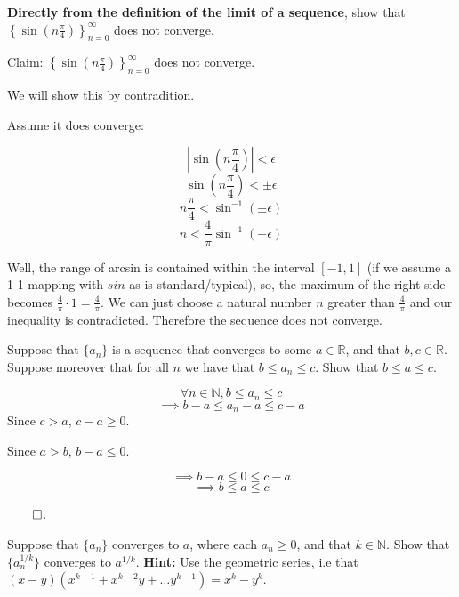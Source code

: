\documentclass[answers]{exam}
\theoremstyle{remark}
\theoremstyle{definition}
\newcommand{\NN}{\mathbb{N}}
\newcommand{\RR}{\mathbb{R}}
\begin{document}
\begin{questions}
\question \textbf{Directly from the definition of the limit of a sequence}, show that $\left\lbrace \sin \left(n \frac{\pi}{4} \right) \right\rbrace_{n=0}^{\infty}$ does not converge.

\begin{solution}

Claim: $\left\lbrace \sin \left(n \frac{\pi}{4} \right) \right\rbrace_{n=0}^{\infty}$ does not converge.


We will show this by contradition.

Assume it does converge:

\[\left|\sin \left(n \frac{\pi}{4} \right) \right| < \epsilon\]
\[\sin \left(n \frac{\pi}{4} \right) < \pm \epsilon\]
\[n \frac{\pi}{4}< \sin^{-1} \left(\pm \epsilon\right)\]
\[n < \frac{4}{\pi} \sin^{-1} \left(\pm \epsilon\right)\]

Well, the range of arcsin is contained within the interval $[-1, 1]$
(if we assume a 1-1 mapping with $sin$ as is standard/typical),
so, the maximum of the right side becomes $\frac{4}{\pi} \cdot 1 = \frac{4}{\pi}$.
We can just choose a natural number $n$ greater than $\frac{4}{\pi}$ and our
inequality is contradicted. Therefore the sequence does not converge.



 \end{solution}





\question Suppose that $\{a_n\}$ is a sequence that converges to some $a \in \RR$, and that $b,c \in \RR$. Suppose moreover that for all $n$ we have that $b \le a_n \le c$. Show that $b \le a \le c$. 
\begin{solution}

\[\forall n \in \NN, b \le a_n \le c\]
\[\implies b-a \leq a_n - a \leq c-a\]
Since $c > a$, $c-a \geq 0$.

Since $a > b$,  $b - a \leq 0$.

\[\implies b-a \leq 0 \leq c-a\]
\[\implies b \leq a \leq c\]

$\qed$.



\end{solution}

\question Suppose that $\{a_n\}$ converges to $a$, where each $a_n \ge 0$, and that $k \in \NN$. Show that $\{a_n^{1/k} \}$ converges to $a^{1/k}$. \textbf{Hint:} Use the geometric series, i.e that $(x-y)(x^{k-1}+x^{k-2}y+ \dots y^{k-1})=x^k-y^k$.
\begin{solution}



\end{solution}
\end{questions}
\end{document}
